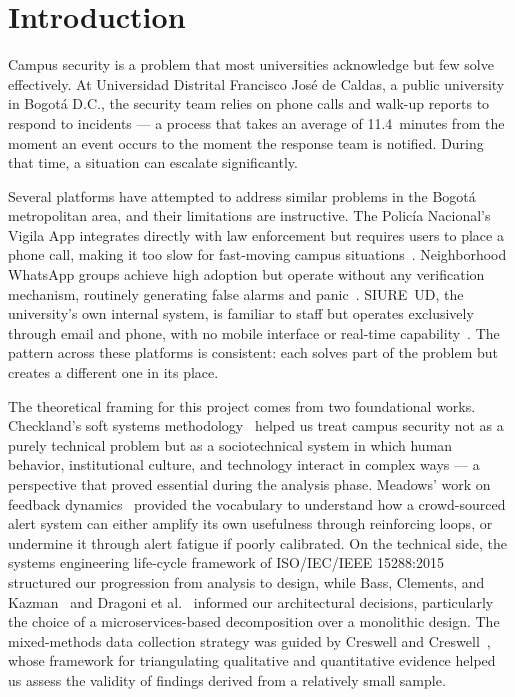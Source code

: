 \documentclass[10pt,twocolumn]{article}
\begin{document}
\section{Introduction}

Campus security is a problem that most universities acknowledge but few solve
effectively. At Universidad Distrital Francisco Jos\'e de Caldas, a public
university in Bogot\'a D.C., the security team relies on phone calls and
walk-up reports to respond to incidents --- a process that takes an average of
11.4~minutes from the moment an event occurs to the moment the response
team is notified. During that time, a situation can escalate significantly.

Several platforms have attempted to address similar problems in the Bogot\'a
metropolitan area, and their limitations are instructive. The Polic\'ia
Nacional's Vigila App integrates directly with law enforcement but requires
users to place a phone call, making it too slow for fast-moving campus
situations~\cite{sierra2026}. Neighborhood WhatsApp groups achieve high
adoption but operate without any verification mechanism, routinely generating
false alarms and panic~\cite{checkland1981}. SIURE~UD, the university's own
internal system, is familiar to staff but operates exclusively through email
and phone, with no mobile interface or real-time capability~\cite{sierra2026}.
The pattern across these platforms is consistent: each solves part of the
problem but creates a different one in its place.

The theoretical framing for this project comes from two foundational works.
Checkland's soft systems methodology~\cite{checkland1981} helped us treat
campus security not as a purely technical problem but as a sociotechnical
system in which human behavior, institutional culture, and technology interact
in complex ways --- a perspective that proved essential during the analysis
phase. Meadows' work on feedback dynamics~\cite{meadows2008} provided the
vocabulary to understand how a crowd-sourced alert system can either amplify
its own usefulness through reinforcing loops, or undermine it through alert
fatigue if poorly calibrated. On the technical side, the systems engineering
life-cycle framework of ISO/IEC/IEEE 15288:2015~\cite{iso15288} structured our
progression from analysis to design, while Bass, Clements, and
Kazman~\cite{bass2013} and Dragoni et al.~\cite{dragoni2017} informed our
architectural decisions, particularly the choice of a microservices-based
decomposition over a monolithic design. The mixed-methods data collection
strategy was guided by Creswell and Creswell~\cite{creswell2018}, whose
framework for triangulating qualitative and quantitative evidence helped us
assess the validity of findings derived from a relatively small sample.
\end{document}
